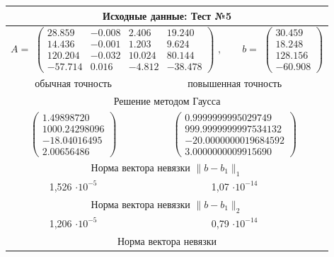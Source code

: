 \documentclass[12pt, a4paper]{article}
\begin{document}
\footnotesize
\begin{center}
	\begin{tabular}{|c|c|}\hline
		\multicolumn{2}{|c|}{Исходные данные: Тест №5}\\
		\hline \multicolumn{2}{|c|}{$A = $
			$
			\begin{pmatrix}
				28.859 & -0.008 & 2.406 & 19.240 \\ 
				14.436 & -0.001 & 1.203 & 9.624 \\ 
				120.204 & -0.032 & 10.024 & 80.144 \\ 
				-57.714 & 0.016 & -4.812 & -38.478 
			\end{pmatrix}
			$
			$,\qquad b = $
			$
			\begin{pmatrix}
				30.459 \\ 
				18.248 \\ 
				128.156 \\ 
				-60.908 
			\end{pmatrix}
			$
		} \\
		\hline
		обычная точность & повышенная точность \\
		\hline
		\multicolumn{2}{|c|}{Решение методом Гаусса} \\
		\hline
		$
		\begin{pmatrix}
			1.49898720 \\ 
			1000.24298096 \\ 
			-18.04016495 \\ 
			2.00656486 
		\end{pmatrix}
		$
		& 
		$
		\begin{pmatrix}
			0.9999999995029749 \\ 
			999.9999999997534132 \\ 
			-20.0000000019684592 \\ 
			3.0000000009915690 
		\end{pmatrix}
		$
		\\
		\hline \multicolumn{2}{|c|}{Норма вектора невязки $\|b - b_1 \|_1$}\\
		\hline
		1,526 $\cdot 10^{-5}$ & 1,07 $\cdot 10^{-14}$\\
		\hline \multicolumn{2}{|c|}{Норма вектора невязки $\|b - b_1 \|_2$}\\
		\hline
		1,206 $\cdot 10^{-5}$ & 0,79 $\cdot 10^{-14}$\\
		\hline \multicolumn{2}{|c|}{Норма вектора невязки 
			
}
\end{tabular}
\end{center}
\end{document}
